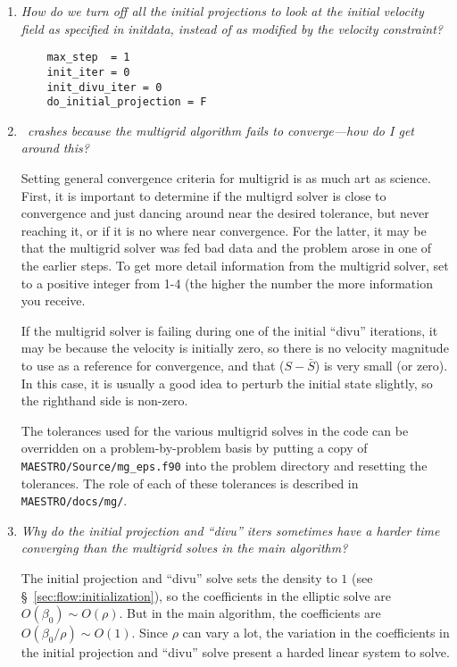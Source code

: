 \begin{enumerate}

\item {\em  How do we turn off all the initial projections to look at the
   initial velocity field as specified in initdata, instead of as
   modified by the velocity constraint?} 
%
\begin{verbatim}
    max_step  = 1
    init_iter = 0
    init_divu_iter = 0
    do_initial_projection = F
\end{verbatim}

\item {\em  \maestro\ crashes because the multigrid algorithm fails to
    converge---how do I get around this?}

  Setting general convergence criteria for multigrid is as much
  art as science. 
  First, it is important to determine if the multigrd solver is
  close to convergence and just dancing around near the desired
  tolerance, but never reaching it, or if it is no where near 
  convergence.  For the latter, it may be that the multigrid
  solver was fed bad data and the problem arose in one of the earlier
  steps.  To get more detail information from the multigrid solver,
  set  to a positive integer from 1-4 (the higher
  the number the more information you receive.

  If the multigrid solver is failing during one of the initial
  ``divu'' iterations, it may be because the velocity is initially
  zero, so there is no velocity magnitude to use as a reference for
  convergence, and that ($S - \bar{S}$) is very small (or zero).  In
  this case, it is usually a good idea to perturb the initial state
  slightly, so the righthand side is non-zero.

  The tolerances used for the various multigrid solves in the code
  can be overridden on a problem-by-problem basis by putting a
  copy of {\tt MAESTRO/Source/mg\_eps.f90} into the problem directory
  and resetting the tolerances.  The role of each of these tolerances
  is described in {\tt MAESTRO/docs/mg/}.

\item {\em Why do the initial projection and ``divu'' iters sometimes
  have a harder time converging than the multigrid solves in the main algorithm?}

  The initial projection and ``divu'' solve sets the density to $1$
  (see \S~\ref{sec:flow:initialization}), so the coefficients in the
  elliptic solve are $O(\beta_0) \sim O(\rho)$.  But in the main
  algorithm, the coefficients are $O(\beta_0/\rho) \sim O(1)$.  Since
  $\rho$ can vary a lot, the variation in the coefficients in the
  initial projection and ``divu'' solve present a harded linear system
  to solve.



\end{enumerate}
